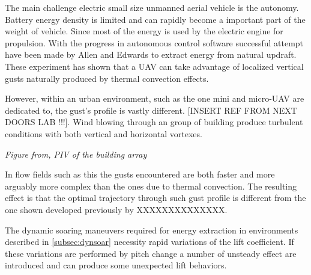 
 \label{subsec:dynsoar}

\par The main challenge electric small size unmanned aerial vehicle is the autonomy.
Battery energy density is limited and can rapidly become a important part of the weight of vehicle.
Since most of the energy is used by the electric engine for propulsion. 
With the progress in autonomous control software successful attempt have been made by Allen \cite{flight_test_soaring_NASA} and Edwards \cite{flight_test_soaring_NCU} to extract energy from natural updraft.
These experiment has shown that a UAV can take advantage of localized vertical gusts naturally produced by thermal convection effects.

\par However, within an urban environment, such as the one mini and micro-UAV are dedicated to, the gust's profile is vastly different. [INSERT REF FROM NEXT DOORS LAB !!!]. 
Wind blowing through an group of building produce turbulent conditions with both vertical and horizontal vortexes.

\par \emph{Figure from, PIV of the building array}

\par In flow fields such as this the gusts encountered are both faster and more arguably more complex than the ones due to thermal convection.
The resulting effect is that the optimal trajectory through such gust profile is different from the one shown developed previously by XXXXXXXXXXXXXX.
 

The dynamic soaring maneuvers required for energy extraction in environments described in \ref{subsec:dynsoar} necessity rapid variations of the lift coefficient. If these variations are performed by pitch change a number of unsteady effect are introduced and can produce some unexpected lift behaviors.
